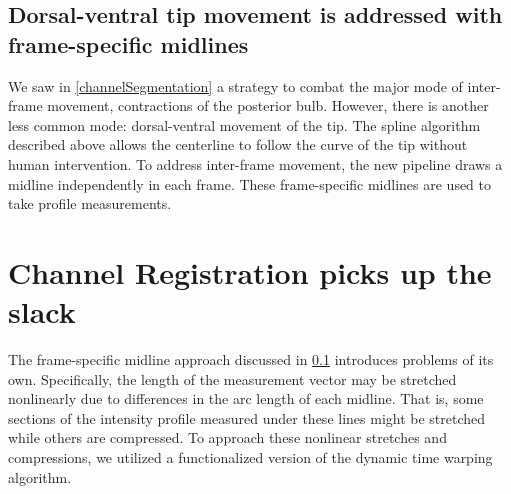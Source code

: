 \subsection{Dorsal-ventral tip movement is addressed with frame-specific midlines} \label{frameSpecificMidlines}
We saw in \ref{channelSegmentation} a strategy to combat the major mode of inter-frame movement, contractions of the posterior bulb. However, there is another less common mode: dorsal-ventral movement of the tip. The spline algorithm described above allows the centerline to follow the curve of the tip without human intervention. To address inter-frame movement, the new pipeline draws a midline independently in each frame. These frame-specific midlines are used to take profile measurements.

\section{Channel Registration picks up the slack}

The frame-specific midline approach discussed in \ref{frameSpecificMidlines} introduces problems of its own. Specifically, the length of the measurement vector may be stretched nonlinearly due to differences in the arc length of each midline. That is, some sections of the intensity profile measured under these lines might be stretched while others are compressed. To approach these nonlinear stretches and compressions, we utilized a functionalized version of the dynamic time warping algorithm.

